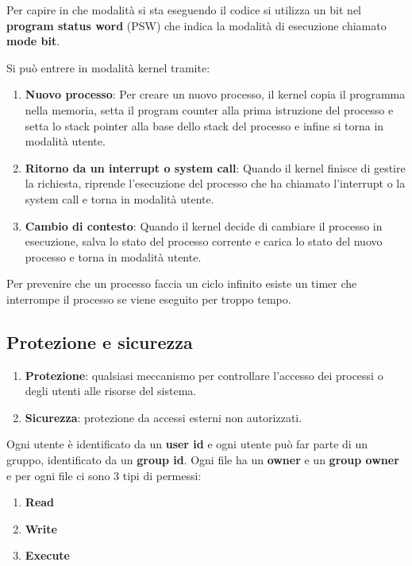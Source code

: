 \documentclass[a4paper]{article}
\begin{document}
\noindent
Per capire in che modalità si sta eseguendo il codice si utilizza un bit nel
\textbf{program status word} (PSW) che indica la modalità di esecuzione chiamato
\textbf{mode bit}.

\noindent Si può entrere in modalità kernel tramite:
\begin{enumerate}
  \item \textbf{Nuovo processo}: Per creare un nuovo processo, il kernel copia il
    programma nella memoria, setta il program counter alla prima istruzione del
    processo e setta lo stack pointer alla base dello stack del processo e infine
    si torna in modalità utente. 

    \item \textbf{Ritorno da un interrupt o system call}: Quando il kernel finisce
      di gestire la richiesta, riprende l'esecuzione del processo che ha chiamato
      l'interrupt o la system call e torna in modalità utente.
      
    \item \textbf{Cambio di contesto}: Quando il kernel decide di cambiare il
      processo in esecuzione, salva lo stato del processo corrente e carica lo
      stato del nuovo processo e torna in modalità utente.
\end{enumerate}

\noindent
Per prevenire che un processo faccia un ciclo infinito esiste un timer che interrompe
il processo se viene eseguito per troppo tempo.

\subsection{Protezione e sicurezza}
\begin{enumerate}
  \item \textbf{Protezione}: qualsiasi meccanismo per controllare l'accesso dei
    processi o degli utenti alle risorse del sistema.

  \item \textbf{Sicurezza}: protezione da accessi esterni non autorizzati.
\end{enumerate}

\noindent
Ogni utente è identificato da un \textbf{user id} e ogni utente può far parte di
un gruppo, identificato da un \textbf{group id}. Ogni file ha un \textbf{owner} e
un \textbf{group owner} e per ogni file ci sono 3 tipi di permessi:
\begin{enumerate}
  \item \textbf{Read}
  \item \textbf{Write}
  \item \textbf{Execute}
\end{enumerate}
\end{document}
